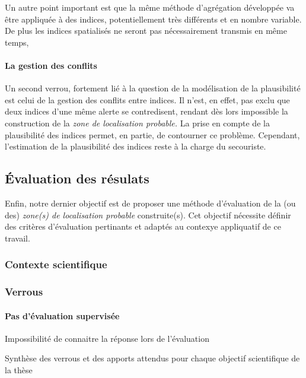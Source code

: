 
Un autre point important est que la même méthode d'agrégation
développée va être appliquée à des indices, potentiellement très
différents et en nombre variable. De plus les indices spatialisés ne
seront pas nécessairement transmis en même temps, 

\paragraph{La gestion des conflits}


Un second verrou, fortement lié à la question de la modélisation de la
plausibilité est celui de la gestion des conflits entre indices. Il
n'est, en effet, pas exclu que deux indices d'une même alerte se
contredisent, rendant dès lors impossible la construction de la
\emph{zone de localisation probable.} La prise en compte de la
plausibilité des indices permet, en partie, de contourner ce
problème. Cependant, l'estimation de la plausibilité des indices reste
à la charge du secouriste.



\subsection{Évaluation des résulats}
\label{subsec:2-1-5}

Enfin, notre dernier objectif est de proposer une méthode d'évaluation
de la (ou des) \emph{zone(s) de localisation probable}  construite(s). Cet
objectif nécessite définir des critères d'évaluation pertinants et
adaptés au contexye appliquatif de ce travail.

\subsubsection{Contexte scientifique}

\subsubsection{Verrous}

\paragraph{Pas d'évaluation supervisée}
Impossibilité de connaitre la réponse lors de l'évaluation


\begin{table}[h]
  \centering
  
  \caption{Synthèse des verrous et des apports attendus pour chaque
    objectif scientifique de la thèse}
  \label{tab:synthese_objectifs}
\end{table}

